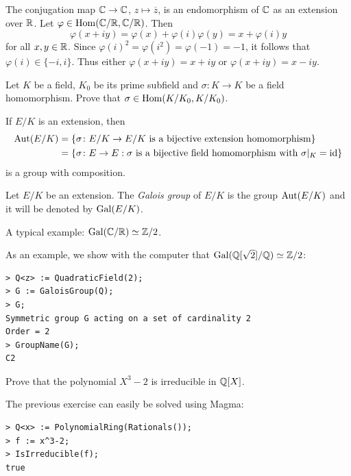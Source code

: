 \begin{example}
	The conjugation map $\mathbb{C}\to\mathbb{C}$, $z\mapsto\overline{z}$, 
	is an endomorphism of $\mathbb{C}$ as an extension over $\mathbb{R}$. Let 
	$\varphi\in\operatorname{Hom}(\mathbb{C}/\mathbb{R},\mathbb{C}/\mathbb{R})$. Then 
	\[
	\varphi(x+iy)=\varphi(x)+\varphi(i)\varphi(y)=x+\varphi(i)y
	\]
	for all $x,y\in\mathbb{R}$. Since $\varphi(i)^2=\varphi(i^2)=\varphi(-1)=-1$, 
	it follows that $\varphi(i)\in\{-i,i\}$. Thus either 
	$\varphi(x+iy)=x+iy$ or $\varphi(x+iy)=x-iy$. 
\end{example}

\begin{exercise}
\label{xca: prime field is fixed}
	Let $K$ be a field, $K_0$ be its prime subfield 
        and $\sigma\colon K\to K$ be a field homomorphism. Prove that 
        $\sigma\in\operatorname{Hom}(K/K_0,K/K_0)$. 
\end{exercise}

If $E/K$ is an extension, then
\begin{align*}
	\operatorname{Aut}(E/K)&=\{\sigma\colon E/K\to E/K\text{ is a bijective extension homomorphism}\}\\
 &=\{\sigma\colon E\to E:\sigma\text{ is a bijective field homomorphism with $\sigma|_K=\operatorname{id}$}\}
\end{align*}
is a group with composition.

\begin{definition}
	Let $E/K$ be an extension. The \emph{Galois group}
	of $E/K$ is the group
	$\operatorname{Aut}(E/K)$ and it will be denoted by $\operatorname{Gal}(E/K)$. 
\end{definition}

A typical example: $\operatorname{Gal}(\mathbb{C}/\mathbb{R})\simeq\mathbb{Z}/2$. 

As an example, we show with the computer that $\operatorname{Gal}(\mathbb{Q}[\sqrt{2}]/\mathbb{Q})\simeq\mathbb{Z}/2$:
\begin{lstlisting}
> Q<z> := QuadraticField(2);
> G := GaloisGroup(Q);
> G;
Symmetric group G acting on a set of cardinality 2
Order = 2
> GroupName(G);
C2
\end{lstlisting}

\begin{exercise}
\label{xca: X^3-2}
    Prove that the polynomial $X^3-2$ is irreducible in $\mathbb{Q}[X]$.  
\end{exercise}

The previous exercise can easily be solved using
Magma: 
\begin{lstlisting}
> Q<x> := PolynomialRing(Rationals());
> f := x^3-2;
> IsIrreducible(f);
true
\end{lstlisting}

